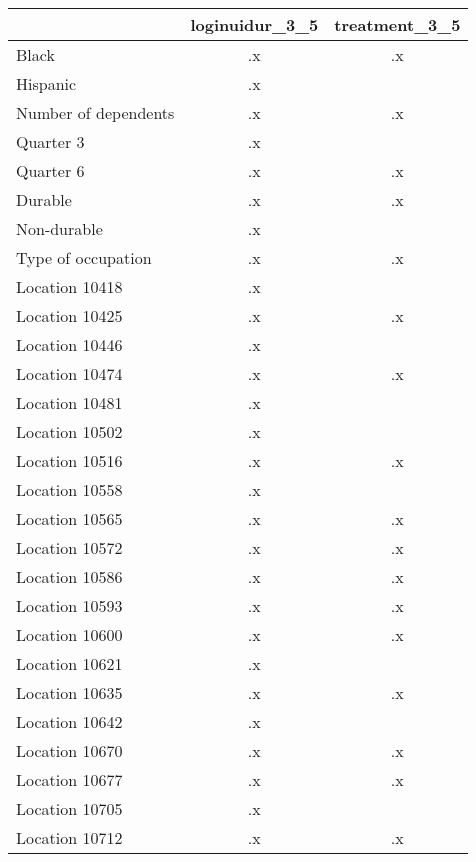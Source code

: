 \begin{tabular}{l*{2}{c}}
\hline\hline
                    &loginuidur\_3\_5&treatment\_3\_5\\
\hline
Black               &          .x&          .x\\
Hispanic            &          .x&            \\
Number of dependents&          .x&          .x\\
Quarter 3           &          .x&            \\
Quarter 6           &          .x&          .x\\
Durable             &          .x&          .x\\
Non-durable         &          .x&            \\
Type of occupation  &          .x&          .x\\
Location 10418      &          .x&            \\
Location 10425      &          .x&          .x\\
Location 10446      &          .x&            \\
Location 10474      &          .x&          .x\\
Location 10481      &          .x&            \\
Location 10502      &          .x&            \\
Location 10516      &          .x&          .x\\
Location 10558      &          .x&            \\
Location 10565      &          .x&          .x\\
Location 10572      &          .x&          .x\\
Location 10586      &          .x&          .x\\
Location 10593      &          .x&          .x\\
Location 10600      &          .x&          .x\\
Location 10621      &          .x&            \\
Location 10635      &          .x&          .x\\
Location 10642      &          .x&            \\
Location 10670      &          .x&          .x\\
Location 10677      &          .x&          .x\\
Location 10705      &          .x&            \\
Location 10712      &          .x&          .x\\

\end{tabular}
